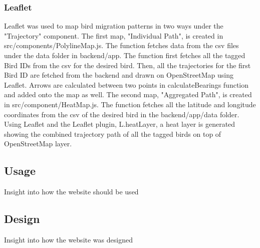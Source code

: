 \documentclass{article}
\begin{document}
\subsubsection*{Leaflet}
Leaflet was used to map bird migration patterns in two ways under the "Trajectory" component. The first map, "Individual Path", is created in src/components/PolylineMap.js.
The function fetches data from the csv files under the data folder in backend/app. The function first fetches all the tagged Bird IDs from the csv for the desired bird. Then,
all the trajectories for the first Bird ID are fetched from the backend and drawn on OpenStreetMap using Leaflet.  Arrows are calculated between two points in calculateBearings 
function and added onto the map as well. 
The second map, "Aggregated Path", is created in src/component/HeatMap.js. The function fetches all the latitude and longitude coordinates from the csv of the desired bird in 
the backend/app/data folder. Using Leaflet and the Leaflet plugin, L.heatLayer, a heat layer is generated showing the combined trajectory path of all the tagged birds on top of 
OpenStreetMap layer.  

\subsection{Usage}
Insight into how the website should be used

\subsection{Design}
Insight into how the website was designed
\end{document}
